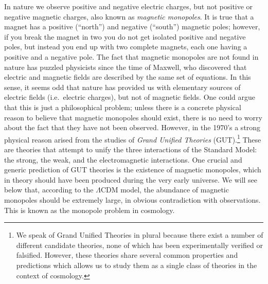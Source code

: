 \documentclass[11pt, a4paper,oneside,openright]{book}
\numberwithin{equation}{section}
\begin{document}
In nature we observe positive and negative electric charges, but not positive or negative magnetic charges, also known as {\it magnetic monopoles}. It is true that a magnet has a positive (``north'') and negative (``south'') magnetic poles; however, if you break the magnet in two you do not get isolated positive and negative poles, but instead you end up with two complete magnets, each one having a positive and a negative pole. The fact that magnetic monopoles are not found in nature has puzzled physicists since the time of Maxwell, who discovered that electric and magnetic fields are described by the same set of equations. In this sense, it seems odd that nature has provided us with elementary sources of electric fields (i.e.\ electric charges), but not of magnetic fields. One could argue that this is just a philosophical problem; unless there is a concrete physical reason to believe that magnetic monopoles should exist, there is no need to worry about the fact that they have not been observed. However, in the 1970's a strong physical reason arised from the studies of {\it Grand Unified Theories} (GUT).\footnote{We speak of Grand Unified Theories in plural because there exist a number of different candidate theories, none of which has been experimentally verified or falsified. However, these theories share several common properties and predictions which allows us to study them as a single class of theories in the context of cosmology.} These are theories that attempt to unify the three interactions of the Standard Model: the strong, the weak, and the electromagnetic interactions. One crucial and generic prediction of GUT theories is the existence of magnetic monopoles, which in theory should have been produced during the very early universe. We will see below that, according to the $\Lambda$CDM model, the abundance of magnetic monopoles should be extremely large, in obvious contradiction with observations. This is known as the monopole problem in cosmology.
\end{document}
